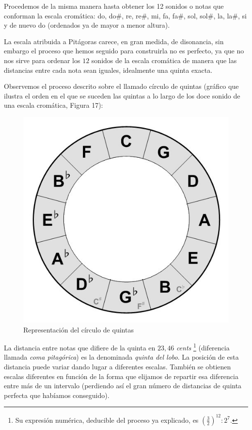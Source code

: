 \documentclass[11pt,a4paper]{article}
\begin{document}
	Procedemos de la misma manera hasta obtener los 12 sonidos o notas que conforman la escala cromática: do, do\#, re, re\#, mi, fa, fa\#, sol, sol\#, la, la\#, si y de nuevo do (ordenados ya de mayor a menor altura).
		
	La escala atribuida a Pitágoras carece, en gran medida, de disonancia, sin embargo el proceso que hemos seguido para construirla no es perfecto, ya que no nos sirve para ordenar los $12$ sonidos de la escala cromática de manera que las distancias entre cada nota sean iguales, idealmente una quinta exacta.
		
	Observemos el proceso descrito sobre el llamado círculo de quintas (gráfico que ilustra el orden en el que se suceden las quintas a lo largo de los doce sonido de una escala cromática, Figura 17):
		
	\begin{figure}[h]
	    \centering
	    \includegraphics[scale = 0.5]{Quintas.jpg}
	    \caption{Representación del círculo de quintas}
	\end{figure}
	
	La distancia entre notas que difiere de la quinta en $23,46$ \textit{cents} \footnote{ Su expresión numérica, deducible del proceso ya explicado, es $ \left( \frac{3}{2} \right) ^{12} : 2^7 $. } (diferencia llamada \emph{coma pitagórica}) es la denominada \emph{quinta del lobo}. La posición de esta distancia puede variar dando lugar a diferentes escalas. También se obtienen escalas diferentes en función de la forma que elijamos de repartir esa diferencia entre más de un intervalo (perdiendo así el gran número de distancias de quinta perfecta que habíamos conseguido).
		
\end{document}
